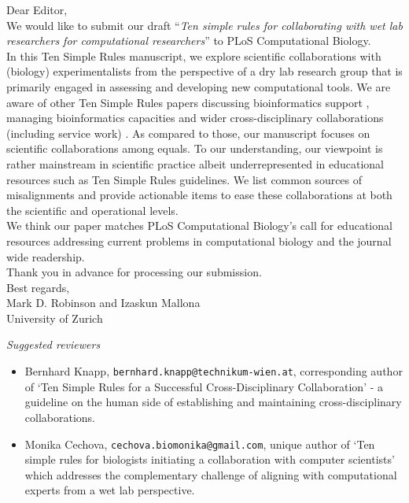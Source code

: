 \documentclass[a4paper]{article}
\begin{document}
\noindent Dear Editor,\\

We would like to submit our draft ``\textit{Ten simple rules for collaborating with wet lab researchers for computational researchers}'' to PLoS Computational Biology.\\

In this Ten Simple Rules manuscript, we explore scientific collaborations with (biology) experimentalists from the perspective of a dry lab research group that is primarily
engaged in assessing and developing new computational tools. We are aware of other Ten Simple Rules papers discussing bioinformatics support \cite{kumuthini2020ten}, managing bioinformatics capacities \cite{aron2021ten} and wider cross-disciplinary collaborations (including service work) \cite{knapp2015ten}. As compared to those, our manuscript focuses on scientific collaborations among equals. To our understanding, our viewpoint is rather mainstream in scientific practice albeit underrepresented in educational resources such as Ten Simple Rules guidelines. We list common sources of misalignments and provide actionable items to ease these collaborations at both the scientific and operational levels.\\

We think our paper matches PLoS Computational Biology's call for educational resources addressing current problems in computational biology and the journal wide readership.\\

Thank you in advance for processing our submission. \\

Best regards,\\

Mark D. Robinson and Izaskun Mallona\\
\indent University of Zurich\\

\vspace{1cm}

\textit{Suggested reviewers}

\begin{itemize}
    \item Bernhard Knapp, \texttt{bernhard.knapp@technikum-wien.at}, corresponding author of `Ten Simple Rules for a Successful Cross-Disciplinary Collaboration' \cite{knapp2015ten} - a guideline on the human side of establishing and maintaining cross-disciplinary collaborations.
    \item Monika Cechova, \texttt{cechova.biomonika@gmail.com}, unique author of `Ten simple rules for biologists initiating a collaboration with computer scientists' \cite{cechova2020ten} which addresses the complementary challenge of aligning with computational experts from a wet lab perspective.
\end{itemize}

\vspace{1cm}

\renewcommand{\section}[2]{}%
  
  
\end{document}
